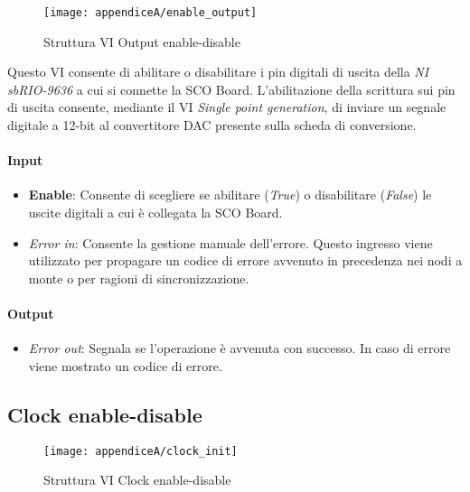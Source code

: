 \begin{figure}[H]
	\begin{center}
		\texttt{[image: appendiceA/enable\_output]}
		\caption{Struttura VI Output enable-disable}
	\end{center}
\end{figure}

Questo VI consente di abilitare o disabilitare i pin digitali di uscita della \textit{NI sbRIO-9636} a cui si connette la SCO Board. L'abilitazione della scrittura sui pin di uscita consente, mediante il VI \textit{Single point generation}, di inviare un segnale digitale a 12-bit al convertitore DAC presente sulla scheda di conversione.

\paragraph*{Input}
\begin{itemize}
	\item \textbf{Enable}: Consente di scegliere se abilitare (\textit{True}) o disabilitare (\textit{False}) le uscite digitali a cui è collegata la SCO Board.
	\item \textit{Error in}: Consente la gestione manuale dell'errore. Questo ingresso viene utilizzato per propagare un codice di errore avvenuto in precedenza nei nodi a monte o per ragioni di sincronizzazione.
\end{itemize}

\paragraph*{Output}
\begin{itemize}
	\item \textit{Error out}: Segnala se l'operazione è avvenuta con successo. In caso di errore viene mostrato un codice di errore.
\end{itemize}

\subsection*{Clock enable-disable}

\begin{figure}[H]
	\begin{center}
		\texttt{[image: appendiceA/clock\_init]}
		\caption{Struttura VI Clock enable-disable}
	\end{center}
\end{figure}

